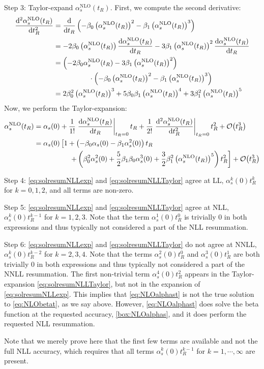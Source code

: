 Step 3: Taylor-expand $\alpha_s^\text{NLO}(t_R)$.
First, we compute the second derivative:
\begin{align}
    \dv[2]{\alpha_s^\text{NLO}(t_R)}{t_R} &= \dv {t_R} \left( -\beta_0 \left(\alpha_s^\text{NLO}(t_R)\right)^2 -\beta_1 \left(\alpha_s^\text{NLO}(t_R)\right)^3 \right)\\
    &= -2\beta_0 \left(\alpha_s^\text{NLO}(t_R)\right) \dv{\alpha_s^\text{NLO}(t_R)}{t_R} -3\beta_1 \left(\alpha_s^\text{NLO}(t_R)\right)^2 \dv{\alpha_s^\text{NLO}(t_R)}{t_R}\\
    &= \left(-2\beta_0 \alpha_s^\text{NLO}(t_R) - 3\beta_1 \left(\alpha_s^\text{NLO}(t_R)\right)^2\right)\nonumber\\
    &\hspace{50pt} \cdot\left( -\beta_0 \left(\alpha_s^\text{NLO}(t_R)\right)^2 -\beta_1 \left(\alpha_s^\text{NLO}(t_R)\right)^3\right)\\
    &= 2\beta_0^2 \left(\alpha_s^\text{NLO}(t_R)\right)^3 + 5\beta_0\beta_1 \left(\alpha_s^\text{NLO}(t_R)\right)^4 + 3\beta_1^2 \left(\alpha_s^\text{NLO}(t_R)\right)^5
\end{align}
Now, we perform the Taylor-expansion:
\begin{align}
    \alpha_s^\text{NLO}(t_R) &= \alpha_s(0) + \frac 1 {1!}\left.\dv{\alpha_s^\text{NLO}(t_R)}{t_R}\right|_{t_R=0} t_R + \frac 1 {2!}\left.\dv[2]{\alpha_s^\text{NLO}(t_R)}{t_R}\right|_{t_R=0} t_R^2 + \order{t_R^3}\\
    &= \alpha_s(0)\left[1 + \left(-\beta_0\alpha_s(0) - \beta_1\alpha_s^2(0) \right) t_R\right. \nonumber\\
    &\hspace{50pt}\left. +\left(\beta_0^2 \alpha_s^2(0) + \frac 5 2 \beta_1 \beta_0 \alpha_s^3(0) + \frac 3 2 \beta_1^2 \left(\alpha_s^\text{NLO}(t_R)\right)^5 \right)t_R^2 \right]  + \order{t_R^3} \label{eq:solresumNLLTaylor}
\end{align}

Step 4: \cref{eq:solresumNLLexp} and \cref{eq:solresumNLLTaylor} agree at LL, $\alpha_s^k(0) t_R^{k}$ for $k=0,1,2$, and all terms are non-zero.

Step 5: \cref{eq:solresumNLLexp} and \cref{eq:solresumNLLTaylor} agree at NLL, $\alpha_s^k(0) t_R^{k-1}$ for $k=1,2,3$.
Note that the term $\alpha_s^1(0) t_R^{0}$ is trivially 0 in both expressions and thus typically not considered a part of the NLL resummation.

Step 6: \cref{eq:solresumNLLexp} and \cref{eq:solresumNLLTaylor} do not agree at NNLL, $\alpha_s^k(0) t_R^{k-2}$ for $k=2,3,4$.
Note that the terms $\alpha_s^2(0) t_R^{0}$ and $\alpha_s^3(0) t_R^{1}$ are both trivially 0 in both expressions and thus typically not considered a part of the NNLL resummation.
The first non-trivial term $\alpha_s^4(0) t_R^{2}$ appears in the Taylor-expansion \cref{eq:solresumNLLTaylor}, but not in the expansion of \cref{eq:solresumNLLexp}.
This implies that \cref{eq:NLOalphast} is not the true solution to \cref{eq:NLObetat}, as we say above.
However, \cref{eq:NLOalphast} does solve the beta function at the requested accuracy, \cref{box:NLOalphas}, and it does perform the requested NLL resummation.

Note that we merely prove here that the first few terms are available and not the full NLL accuracy, which requires that all terms $\alpha_s^k(0) t_R^{k-1}$ for $k=1,\cdots,\infty$ are present.

